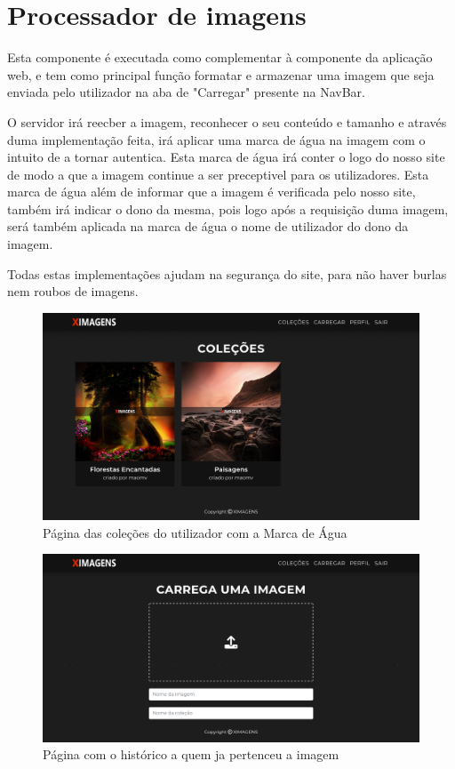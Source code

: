 \documentclass{report}
\begin{document}
\chapter{Processador de imagens}
Esta componente é executada como complementar à componente da aplicação web, e tem como principal função formatar e armazenar uma imagem que seja enviada pelo utilizador na aba de "Carregar" presente na NavBar.

O servidor irá reecber a imagem, reconhecer o seu conteúdo e tamanho e através duma implementação feita, irá aplicar uma marca de água na imagem com o intuito de a tornar autentica. Esta marca de água irá conter o logo do nosso site de modo a que a imagem continue a ser preceptivel para os utilizadores.
Esta marca de água além de informar que a imagem é verificada pelo nosso site, também irá indicar o dono da mesma, pois logo após a requisição duma imagem, será também aplicada na marca de água o nome de utilizador do dono da imagem.

Todas estas implementações ajudam na segurança do site, para não haver burlas nem roubos de imagens.

\begin{figure}[H]
    \centering
    \includegraphics[width=\textwidth]{colecoes.png}
    \caption{Página das coleções do utilizador com a Marca de Água}
\end{figure}

\begin{figure}[H]
    \centering
    \includegraphics[width=\textwidth]{upload.png}
    \caption{Página com o histórico a quem ja pertenceu a imagem}
\end{figure}
\end{document}
